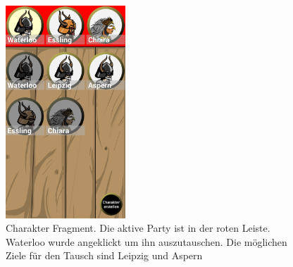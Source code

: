 \documentclass[extern,palatino]{cgBA}
\begin{document}
	
\newpage
\begin{figure}[H] 
		\centering
		\includegraphics[width=0.4\textwidth]{charfragment.png}
		\caption{Charakter Fragment. Die aktive Party ist in der roten Leiste. Waterloo wurde angeklickt um ihn auszutauschen. Die möglichen Ziele für den Tausch sind Leipzig und Aspern}
		\label{fig:Bild2}
\end{figure} 
\end{document}
